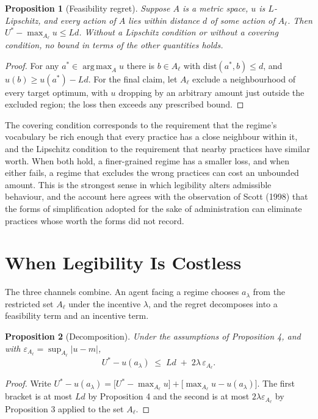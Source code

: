 \documentclass[11pt]{article}
\newtheorem{proposition}{Proposition}
\theoremstyle{remark}
\newcommand{\argmax}{\operatorname*{arg\,max}}
\begin{document}
\begin{proposition}[Feasibility regret]
Suppose $A$ is a metric space, $u$ is $L$-Lipschitz, and every action of $A$ lies within distance $d$ of some action of $A_\ell$. Then $U^\ast-\max_{A_\ell}u\le Ld$. Without a Lipschitz condition or without a covering condition, no bound in terms of the other quantities holds.
\end{proposition}

\begin{proof}
For any $a^\ast\in\argmax_A u$ there is $b\in A_\ell$ with $\mathrm{dist}(a^\ast,b)\le d$, and $u(b)\ge u(a^\ast)-Ld$. For the final claim, let $A_\ell$ exclude a neighbourhood of every target optimum, with $u$ dropping by an arbitrary amount just outside the excluded region; the loss then exceeds any prescribed bound.
\end{proof}

The covering condition corresponds to the requirement that the regime's vocabulary be rich enough that every practice has a close neighbour within it, and the Lipschitz condition to the requirement that nearby practices have similar worth. When both hold, a finer-grained regime has a smaller loss, and when either fails, a regime that excludes the wrong practices can cost an unbounded amount. This is the strongest sense in which legibility alters admissible behaviour, and the account here agrees with the observation of Scott (1998) that the forms of simplification adopted for the sake of administration can eliminate practices whose worth the forms did not record.

\section{When Legibility Is Costless}

The three channels combine. An agent facing a regime chooses $a_\lambda$ from the restricted set $A_\ell$ under the incentive $\lambda$, and the regret decomposes into a feasibility term and an incentive term.

\begin{proposition}[Decomposition]
Under the assumptions of Proposition 4, and with $\varepsilon_{A_\ell}=\sup_{A_\ell}|u-m|$,
\[
U^\ast-u(a_\lambda)\;\le\;Ld\;+\;2\lambda\,\varepsilon_{A_\ell}.
\]
\end{proposition}

\begin{proof}
Write $U^\ast-u(a_\lambda)=\bigl[U^\ast-\max_{A_\ell}u\bigr]+\bigl[\max_{A_\ell}u-u(a_\lambda)\bigr]$. The first bracket is at most $Ld$ by Proposition 4 and the second is at most $2\lambda\varepsilon_{A_\ell}$ by Proposition 3 applied to the set $A_\ell$.
\end{proof}
\end{document}
